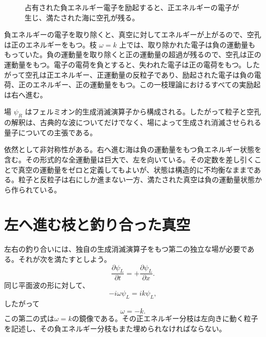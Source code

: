 \begin{figure}[htbp]
\centering
{}
\caption{占有された負エネルギー電子を励起すると、正エネルギーの電子が生じ、満たされた海に空孔が残る。}
\end{figure}

負エネルギーの電子を取り除くと、真空に対してエネルギーが上がるので、空孔は正のエネルギーをもつ。枝 \(\omega=k\) 上では、取り除かれた電子は負の運動量ももっていた。負の運動量を取り除くと正の運動量の超過が残るので、空孔は正の運動量をもつ。電子の電荷を負とすると、失われた電子は正の電荷をもつ。したがって空孔は正エネルギー、正運動量の反粒子であり、励起された電子は負の電荷、正のエネルギー、正の運動量をもつ。この一枝理論におけるすべての実励起は右へ進む。

場 \(\psi_R\) はフェルミオン的生成消滅演算子から構成される。したがって粒子と空孔の解釈は、古典的な波についてだけでなく、場によって生成され消滅させられる量子についての主張である。

依然として非対称性がある。右へ進む海は負の運動量をもつ負エネルギー状態を含む。その形式的な全運動量は巨大で、左を向いている。その定数を差し引くことで真空の運動量をゼロと定義してもよいが、状態は構造的に不均衡なままである。粒子と反粒子は右にしか進まない一方、満たされた真空は負の運動量状態から作られている。

\section{左へ進む枝と釣り合った真空}

左右の釣り合いには、独自の生成消滅演算子をもつ第二の独立な場が必要である。それが次を満たすとしよう。
\begin{equation}
\frac{\partial\psi_L}{\partial t}
=
+\frac{\partial\psi_L}{\partial x}.
\end{equation}
同じ平面波の形に対して、
\begin{equation}
-i\omega\psi_L=ik\psi_L,
\end{equation}
したがって
\begin{equation}
\omega=-k.
\end{equation}
この第二の式は\(\omega=k\)の鏡像である。その正エネルギー分枝は左向きに動く粒子を記述し、その負エネルギー分枝もまた埋められなければならない。


